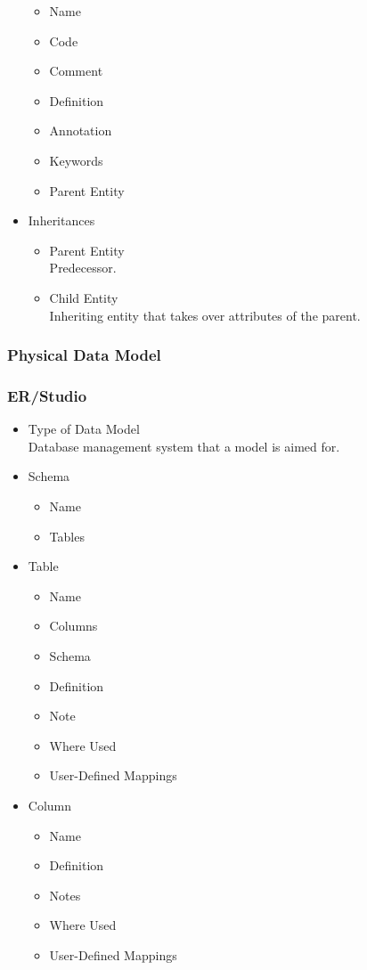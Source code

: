 \begin{itemize}
	\begin{itemize}
		\item Name 
		\item Code 
		\item Comment
		\item Definition
		\item Annotation
		\item Keywords
		\item Parent Entity
	\end{itemize}
	\item Inheritances
	\begin{itemize}
		\item Parent Entity \\ 
		Predecessor.
		\item Child Entity \\ 
		Inheriting entity that takes over attributes of the parent.
	\end{itemize}
\end{itemize}

\subsubsection{Physical Data Model}

\subsubsection{ER/Studio}

\begin{itemize}
	\item Type of Data Model\\
	Database management system that a model is aimed for.
	\item Schema
	 \begin{itemize}
	 	\item Name
	 	\item Tables
	 \end{itemize}
	\item Table
	\begin{itemize}
		\item Name
		\item Columns
		\item Schema
		\item Definition
		\item Note
		\item Where Used
		\item User-Defined Mappings
	\end{itemize}
	\item Column
	\begin{itemize}
		\item Name
		\item Definition
		\item Notes
		\item Where Used
		\item User-Defined Mappings
	\end{itemize}
\end{itemize}

